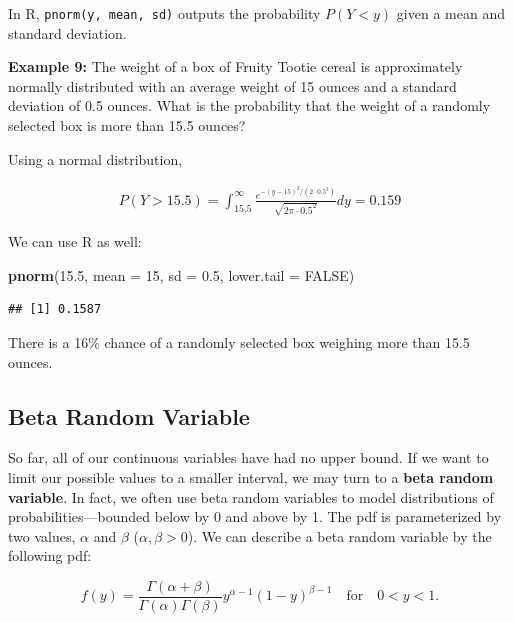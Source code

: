 \documentclass[
]{krantz}
\newenvironment{Shaded}{\begin{snugshade}}{\end{snugshade}}
\newcommand{\AttributeTok}[1]{\textcolor[rgb]{0.27,0.27,0.27}{#1}}
\newcommand{\ConstantTok}[1]{\textcolor[rgb]{0.37,0.37,0.37}{#1}}
\newcommand{\DecValTok}[1]{\textcolor[rgb]{0.06,0.06,0.06}{#1}}
\newcommand{\FloatTok}[1]{\textcolor[rgb]{0.06,0.06,0.06}{#1}}
\newcommand{\FunctionTok}[1]{\textcolor[rgb]{0.27,0.27,0.27}{\textbf{#1}}}
\newcommand{\NormalTok}[1]{#1}
\begin{document}
In R, \texttt{pnorm(y,\ mean,\ sd)} outputs the probability \(P(Y < y)\) given a mean and standard deviation.

\textbf{Example 9:} The weight of a box of Fruity Tootie cereal is approximately normally distributed with an average weight of 15 ounces and a standard deviation of 0.5 ounces. What is the probability that the weight of a randomly selected box is more than 15.5 ounces?

Using a normal distribution,

\begin{align*} 
P(Y > 15.5) = \int_{15.5}^{\infty} \frac{e^{-(y-15)^2/ (2\cdot 0.5^2)}}{\sqrt{2\pi\cdot 0.5^2}}dy = 0.159
\end{align*}

We can use R as well:

\begin{Shaded}
\begin{Highlighting}[]
\FunctionTok{pnorm}\NormalTok{(}\FloatTok{15.5}\NormalTok{, }\AttributeTok{mean =} \DecValTok{15}\NormalTok{, }\AttributeTok{sd =} \FloatTok{0.5}\NormalTok{, }\AttributeTok{lower.tail =} \ConstantTok{FALSE}\NormalTok{)}
\end{Highlighting}
\end{Shaded}

\begin{verbatim}
## [1] 0.1587
\end{verbatim}

There is a 16\% chance of a randomly selected box weighing more than 15.5 ounces.

\subsection{Beta Random Variable}\label{beta-random-variable}

So far, all of our continuous variables have had no upper bound. If we want to limit our possible values to a smaller interval, we may turn to a \textbf{beta random variable}. In fact, we often use beta random variables to model distributions of probabilities---bounded below by 0 and above by 1. The pdf is parameterized by two values, \(\alpha\) and \(\beta\) (\(\alpha, \beta > 0\)). We can describe a beta random variable by the following pdf:

\begin{equation}
f(y) = \frac{\Gamma(\alpha + \beta)}{\Gamma(\alpha)\Gamma(\beta)} y^{\alpha-1} (1-y)^{\beta-1} \quad \textrm{for} \quad 0 < y < 1.
\label{eq:betaRV}
\end{equation}
\end{document}
